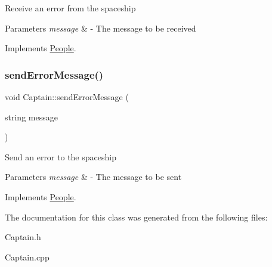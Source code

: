 Receive an error from the spaceship 
\begin{DoxyParams}{Parameters}
{\em message} & -\/ The message to be received \\
\hline
\end{DoxyParams}


Implements \hyperlink{classPeople_a0685df78be631783138865e03cc7c85d}{People}.

\mbox{\label{classCaptain_a88abc1940bcdef8a655efc20ebd68d50}} 
\subsubsection{\texorpdfstring{send\+Error\+Message()}{sendErrorMessage()}}
{\footnotesize\ttfamily void Captain\+::send\+Error\+Message (\begin{DoxyParamCaption}\item[{string}]{message }\end{DoxyParamCaption})\hspace{0.3cm}{\ttfamily [virtual]}}

Send an error to the spaceship 
\begin{DoxyParams}{Parameters}
{\em message} & -\/ The message to be sent \\
\hline
\end{DoxyParams}


Implements \hyperlink{classPeople_a572a35170f61d1848eb04b65baafb057}{People}.



The documentation for this class was generated from the following files\+:\begin{DoxyCompactItemize}
\item 
Captain.\+h\item 
Captain.\+cpp\end{DoxyCompactItemize}

